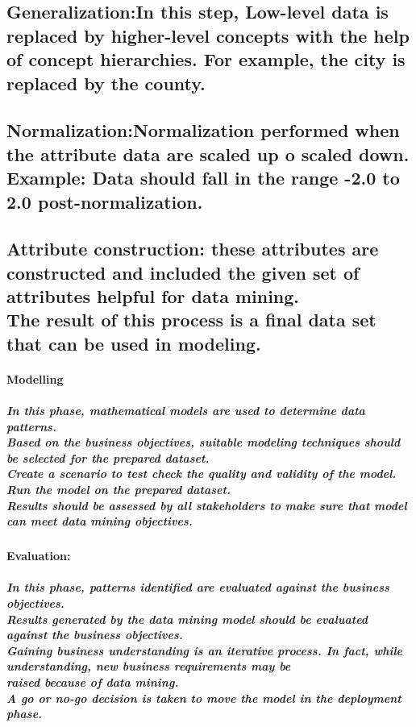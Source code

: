 \documentclass{article}
\begin{document}
\subsection*{Generalization:\small In this step, Low-level data is replaced by higher-level concepts with the help of concept hierarchies. For example, the city is replaced by the county.}
\subsection*{Normalization:\small Normalization performed when the attribute data are scaled up o scaled down. Example: Data should fall in the range -2.0 to 2.0 post-normalization.}
\subsection*{Attribute construction: \small these attributes are constructed and included the given set of attributes helpful for data mining.\\The result of this process is a final data set that can be used in modeling.}
\newpage

\paragraph{Modelling}
\subparagraph{In this phase, mathematical models are used to determine data patterns.\\Based on the business objectives, suitable modeling techniques should be selected for the prepared dataset.\\Create a scenario to test check the quality and validity of the model.\\Run the model on the prepared dataset.\\Results should be assessed by all stakeholders to make sure that model can meet data mining objectives.}
\paragraph{Evaluation:}
\subparagraph{In this phase, patterns identified are evaluated against the business objectives.\\Results generated by the data mining model should be evaluated against the business objectives.\\Gaining business understanding is an iterative process. In fact, while understanding, new business requirements may be\\raised because of data mining.\\A go or no-go decision is taken to move the model in the deployment phase.}
\newpage
\end{document}
